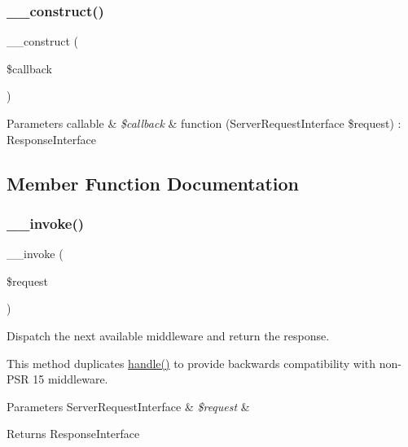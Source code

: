 \subsubsection{\texorpdfstring{\+\_\+\+\_\+construct()}{\_\_construct()}}
{\footnotesize\ttfamily \+\_\+\+\_\+construct (\begin{DoxyParamCaption}\item[{callable}]{\$callback }\end{DoxyParamCaption})}


\begin{DoxyParams}[1]{Parameters}
callable & {\em \$callback} & function (Server\+Request\+Interface \$request) \+: Response\+Interface \\
\hline
\end{DoxyParams}


\subsection{Member Function Documentation}
\mbox{\label{class_pes_1_1_middleware_1_1_request_handler_aeabd5c244eb0279b90bac4efacc0b012}} 
\subsubsection{\texorpdfstring{\+\_\+\+\_\+invoke()}{\_\_invoke()}}
{\footnotesize\ttfamily \+\_\+\+\_\+invoke (\begin{DoxyParamCaption}\item[{Server\+Request\+Interface}]{\$request }\end{DoxyParamCaption})}

Dispatch the next available middleware and return the response.

This method duplicates {\ttfamily \mbox{\hyperlink{class_pes_1_1_middleware_1_1_request_handler_a426da9efc10c90c1fdee43f2107a7e28}{handle()}}} to provide backwards compatibility with non-\/\+P\+SR 15 middleware.


\begin{DoxyParams}[1]{Parameters}
Server\+Request\+Interface & {\em \$request} & \\
\hline
\end{DoxyParams}
\begin{DoxyReturn}{Returns}
Response\+Interface 
\end{DoxyReturn}
\mbox{\label{class_pes_1_1_middleware_1_1_request_handler_a426da9efc10c90c1fdee43f2107a7e28}} 
